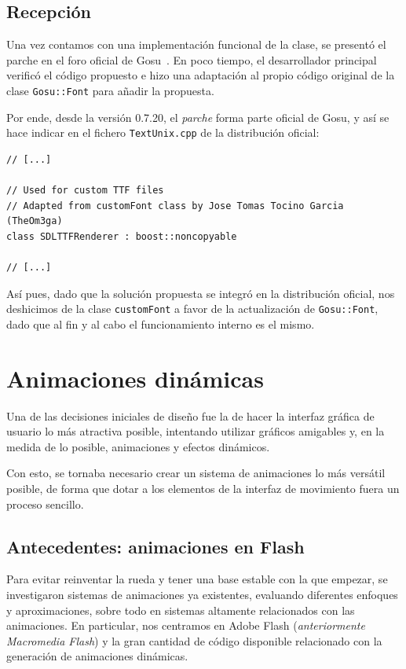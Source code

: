 \subsection{Recepción}

Una vez contamos con una implementación funcional de la clase, se presentó el
parche en el foro oficial de Gosu~\cite{foroGosu}. En poco tiempo, el
desarrollador principal verificó el código propuesto e hizo una adaptación al
propio código original de la clase \texttt{Gosu::Font} para añadir la
propuesta. 

Por ende, desde la versión 0.7.20, el \textit{parche} forma parte
oficial de Gosu, y así se hace indicar en el fichero \texttt{TextUnix.cpp} de la
distribución oficial:

\begin{verbatim}
// [...]

// Used for custom TTF files
// Adapted from customFont class by Jose Tomas Tocino Garcia (TheOm3ga)
class SDLTTFRenderer : boost::noncopyable

// [...]
\end{verbatim}

Así pues, dado que la solución propuesta se integró en la distribución oficial,
nos deshicimos de la clase \texttt{customFont} a favor de la actualización de
\texttt{Gosu::Font}, dado que al fin y al cabo el funcionamiento interno es
el mismo.

\section{Animaciones dinámicas}
\label{sec:animaciones}

Una de las decisiones iniciales de diseño fue la de hacer la interfaz gráfica de
usuario lo más atractiva posible, intentando utilizar gráficos amigables y, en
la medida de lo posible, animaciones y efectos dinámicos.

Con esto, se tornaba necesario crear un sistema de animaciones lo más versátil
posible, de forma que dotar a los elementos de la interfaz de movimiento fuera
un proceso sencillo. 

\subsection{Antecedentes: animaciones en Flash}
Para evitar reinventar la rueda y tener una base estable con la que empezar, se
investigaron sistemas de animaciones ya existentes, evaluando diferentes
enfoques y aproximaciones, sobre todo en sistemas altamente relacionados con las
animaciones. En particular, nos centramos en Adobe Flash (\textit{anteriormente
  Macromedia Flash}) y la gran cantidad de código disponible relacionado con la
generación de animaciones dinámicas.

